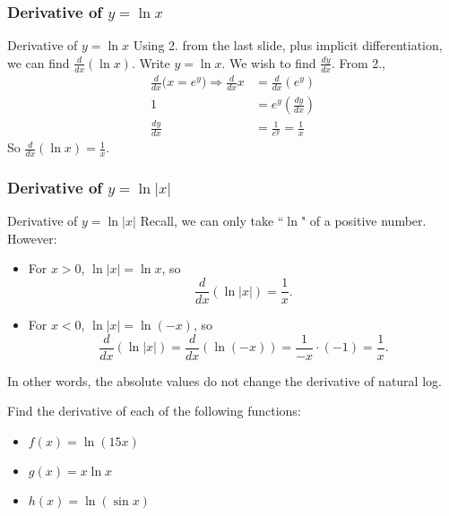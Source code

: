 \documentclass[cal1spr16Lectures.tex]{subfiles}
\begin{document}
\subsubsection{Derivative of $y=\ln x$}

\begin{frame}{\small Derivative of $y=\ln x$}\footnotesize
Using 2. from the last slide, plus implicit differentiation, we can find $\textstyle\frac{d}{dx}\left(\ln x\right)$.  Write $y=\ln x$.  We wish to find $\textstyle\frac{dy}{dx}$.  From 2.,
\begin{align*}
\frac{d}{dx}\big(x=e^y\big) \Rightarrow \frac{d}{dx}x &= \frac{d}{dx}(e^y) \\[0.5pc]
1 &= e^y\left(\frac{dy}{dx}\right) \\[0.5pc]
\frac{dy}{dx} &= \frac{1}{e^y}=\frac{1}{x} 
\end{align*}
So \alert{$\frac{d}{dx}(\ln x)=\frac{1}{x}$}.
\end{frame}

\subsubsection{Derivative of $y=\ln{|x|}$}

\begin{frame}{\small Derivative of $y=\ln |x|$}\footnotesize
Recall, we can only take ``$\ln{}$" of a positive number.  However:
\begin{itemize}
\item For $x>0$, $\ln |x| = \ln x$, so 
\[\frac{d}{dx} (\ln |x|)=\frac{1}{x}.\]
\item For $x<0$, $\ln |x| = \ln(-x)$, so 
\[\frac{d}{dx} (\ln |x|)= \frac{d}{dx} (\ln(-x)) = \frac{1}{-x} \cdot (-1) = \frac{1}{x}.\]
\end{itemize}
In other words, the absolute values do not change the derivative of natural log.
\end{frame}

\begin{frame}
\begin{exe} Find the derivative of each of the following functions:
\begin{itemize}
\item $f(x)=\ln(15x)$
\item $g(x)=x \ln x$
\item $h(x)=\ln(\sin x)$
\end{itemize}
\end{exe}
\end{frame}
\end{document}
